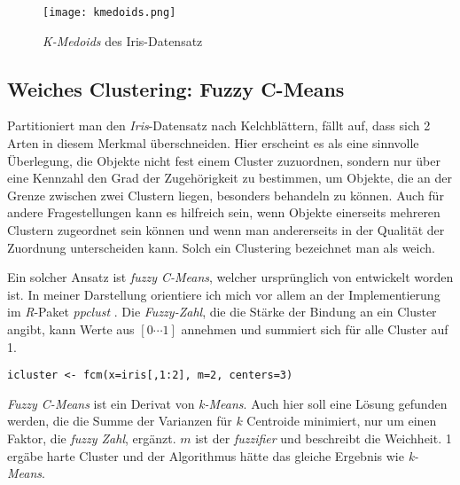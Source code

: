 \documentclass[a4paper,12pt,twoside]{article}
\newcommand{\Fachbegriff}[1]{\textit{#1}}
\begin{document}

\begin{figure}
	\centering
	\texttt{[image: kmedoids.png]}
	\caption{\Fachbegriff{K-Medoids} des Iris-Datensatz}
	\label{img:kmedoids}
\end{figure}
 

\subsection{Weiches Clustering: Fuzzy C-Means}
\label{sec:weich}
Partitioniert man den \Fachbegriff{Iris}-Datensatz nach Kelchblättern, fällt auf, dass sich 2 Arten in diesem Merkmal überschneiden. Hier erscheint es als eine sinnvolle Überlegung, die Objekte nicht fest einem Cluster zuzuordnen, sondern nur über eine Kennzahl den Grad der Zugehörigkeit zu bestimmen, um Objekte, die an der Grenze zwischen zwei Clustern liegen, besonders behandeln zu können. Auch für andere Fragestellungen kann es hilfreich sein, wenn Objekte einerseits mehreren Clustern zugeordnet sein können und wenn man andererseits in der Qualität der Zuordnung unterscheiden kann. Solch ein Clustering bezeichnet man als weich.

Ein solcher Ansatz ist \Fachbegriff{fuzzy C-Means}, welcher ursprünglich von \textcite{Bezdek.1981, Bezdek.1973} entwickelt worden ist. In meiner Darstellung orientiere ich mich vor allem an der Implementierung im \Fachbegriff{R}-Paket \Fachbegriff{ppclust} \autocite{ZeynelCebeci.20190101}. Die \Fachbegriff{Fuzzy-Zahl}, die die Stärke der Bindung an ein Cluster angibt, kann Werte aus $[0\cdots1]$ annehmen und summiert sich für alle Cluster auf 1.

\begin{minipage}{\linewidth}
\begin{lstlisting}[caption={\Fachbegriff{Fuzzy C-Means} in \Fachbegriff{R}}, label=list:fuzzycmeans]
icluster <- fcm(x=iris[,1:2], m=2, centers=3)
\end{lstlisting}
\end{minipage}

\Fachbegriff{Fuzzy C-Means} ist ein Derivat von \Fachbegriff{k-Means}. Auch hier soll eine Lösung gefunden werden, die die Summe der Varianzen für $k$ Centroide minimiert, nur um einen Faktor, die \Fachbegriff{fuzzy Zahl}, ergänzt. $m$ ist der \Fachbegriff{fuzzifier} und beschreibt die Weichheit. 1 ergäbe harte Cluster und der Algorithmus hätte das gleiche Ergebnis wie \Fachbegriff{k-Means}.
\end{document}
